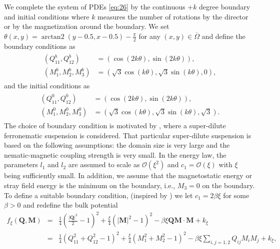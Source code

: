 \documentclass{article}
\def\Qvec{\mathbf{Q}}
\def \Mvec{\mathbf{M}}
\begin{document}
We complete the system of PDEs \eqref{eq:26} by the continuous $+k$ degree boundary and initial conditions where $k$ measures the number of rotations by the director or by the magnetization around the boundary. We set $\theta\left(x, y\right) = \operatorname{arctan2}\left(y - 0.5, x - 0.5\right) - \frac{\pi}{2}$ for any $(x,y) \in \overline{\Omega}$ and define the boundary conditions as
\begin{gather}
\begin{aligned}
\left(Q^b_{11}, Q^b_{12}\right)&=\left(\cos(2k\theta),\sin(2k\theta)\right),\\
\left(M^b_{1}, M^b_{2}, M^b_{3}\right)&=\left(\sqrt 3\cos(k\theta), \sqrt 3\sin(k\theta), 0\right),\label{eq:27'}
\end{aligned}
\end{gather}
and the initial conditions as
\begin{gather}
\begin{aligned}
\left(Q^0_{11}, Q^0_{12}\right)&=\left(\cos(2k\theta),\sin(2k\theta)\right),\\
\left(M^0_{1}, M^0_{2}, M^0_{3}\right)&=\left(\sqrt 3\cos(k\theta), \sqrt 3\sin(k\theta), \sqrt 3\right).\label{eq:28'}
\end{aligned}
\end{gather}
The choice of boundary condition is motivated by \cite{Canevari}, where a super-dilute ferronematic suspension is considered. That particular super-dilute suspension is based on the following assumptions: the domain size is very large and the nematic-magnetic coupling strength is very small. In the energy law, the parameters $l_1$ and $l_2$ are assumed to scale as $\mathcal{O}(\xi^2)$ and $c_1=\mathcal{O}\left(\xi\right)$ with $\xi$ being sufficiently small. In addition, we assume that the magnetostatic energy or stray field energy is the minimum on the boundary, i.e., $M_3=0$ on the boundary. 
To define a suitable boundary condition, (inspired by \cite{Canevari}) we let $c_1=2\beta\xi$ for some $\beta>0$ and redefine the bulk potential 
\begin{eqnarray}
f_{\xi}\left(\Qvec, \Mvec\right)&=&\frac{1}{4}\left(\frac{|\Qvec|^2}{2}-1\right)^2+\frac{\xi}{4}\left(|\Mvec|^2-1\right)^2-\beta\xi\Qvec\Mvec\cdot\Mvec+k_{\xi}\nonumber\\
&=& \frac{1}{4}\left(Q_{11}^2+Q_{12}^2-1\right)^2+\frac{\xi}{4}\left(M_1^2+M_2^2-1\right)^2-\beta\xi\sum_{i,j=1,2}Q_{ij}M_iM_j+k_{\xi},\nonumber\\ \label{eq:bulk'}
\end{eqnarray}
\end{document}
